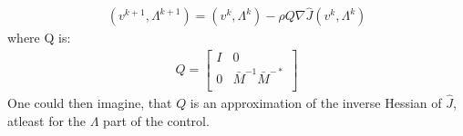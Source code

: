 \documentclass[11pt,a4paper]{article}
\begin{document}
\begin{align}
(v^{k+1},\Lambda^{k+1}) = (v^{k},\Lambda^{k}) -\rho Q\nabla\hat{J}(v^{k},\Lambda^{k}) 
\end{align}
where Q is:
\begin{align}
Q = \left[ \begin{array}{cc}
	I & 0 \\
	0 & \bar{M}^{-1}\bar{M}^{-*} \\
	\end{array} \right]
\end{align}
One could then imagine, that $Q$ is an approximation of the inverse Hessian of $\hat{J}$, atleast for the $\Lambda$ part of the control.


\end{document}
